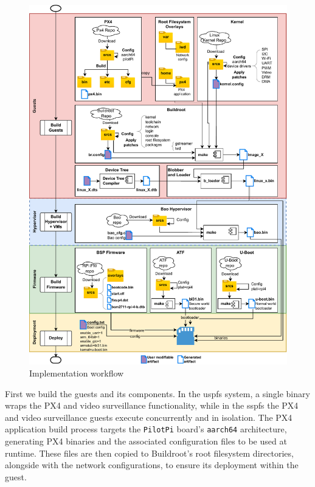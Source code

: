 \begin{figure}[!hbt]
  \centering
  \includegraphics[width=1.0\textwidth]{./img/pdf/uav-main-Implem-Workflow} 
  \caption{Implementation workflow}%
  \label{fig:uav-main-Implem-Workflow}
\end{figure}

First we build the guests and its components. In the \gls{uspfs} system, a
single binary wraps the PX4 and video surveillance functionality, while in the
\gls{sspfs} the PX4 and video surveillance guests execute concurrently and in
isolation.
The PX4 application build process targets the \lstinline{PilotPi} board's
\lstinline{aarch64} architecture, generating PX4 binaries and the associated
configuration files to be used at runtime. These files are then copied to Buildroot's root
filesystem directories, alongside with the network configurations, to ensure its deployment within the guest.

